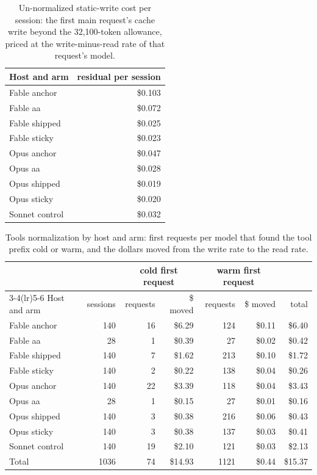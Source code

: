 \documentclass[11pt,letterpaper]{article}
\newcommand{\ToolsAllowance}{32{,}100}
\begin{document}
\begin{table}[tbp]
\centering\small
\caption{Un-normalized static-write cost per session: the first main request's cache write beyond the
\ToolsAllowance-token allowance, priced at the write-minus-read rate of that request's model.}
\label{vt:tab:staticresid}
\begin{tabular*}{0.6\textwidth}{@{\extracolsep{\fill}}l r@{}}
\toprule
Host and arm & residual per session \\
\midrule
Fable anchor & \$0.103 \\
Fable aa & \$0.072 \\
Fable shipped & \$0.025 \\
Fable sticky & \$0.023 \\
Opus anchor & \$0.047 \\
Opus aa & \$0.028 \\
Opus shipped & \$0.019 \\
Opus sticky & \$0.020 \\
Sonnet control & \$0.032 \\
\bottomrule
\end{tabular*}
 \end{table}

\begin{table}[tbp]
\centering\scriptsize
\caption{Tools normalization by host and arm: first requests per model that found the tool prefix cold or warm, and
the dollars moved from the write rate to the read rate.}
\label{vt:tab:toolsnorm}
\begin{tabular*}{\textwidth}{@{\extracolsep{\fill}}l r r r r r r@{}}
\toprule
 & & \multicolumn{2}{c}{cold first request} & \multicolumn{2}{c}{warm first request} & \\
\cmidrule(lr){3-4}\cmidrule(lr){5-6}
Host and arm & sessions & requests & \$ moved & requests & \$ moved & total \\
\midrule
Fable anchor & 140 & 16 & \$6.29 & 124 & \$0.11 & \$6.40 \\
Fable aa & 28 & 1 & \$0.39 & 27 & \$0.02 & \$0.42 \\
Fable shipped & 140 & 7 & \$1.62 & 213 & \$0.10 & \$1.72 \\
Fable sticky & 140 & 2 & \$0.22 & 138 & \$0.04 & \$0.26 \\
Opus anchor & 140 & 22 & \$3.39 & 118 & \$0.04 & \$3.43 \\
Opus aa & 28 & 1 & \$0.15 & 27 & \$0.01 & \$0.16 \\
Opus shipped & 140 & 3 & \$0.38 & 216 & \$0.06 & \$0.43 \\
Opus sticky & 140 & 3 & \$0.38 & 137 & \$0.03 & \$0.41 \\
Sonnet control & 140 & 19 & \$2.10 & 121 & \$0.03 & \$2.13 \\
\midrule
Total & 1036 & 74 & \$14.93 & 1121 & \$0.44 & \$15.37 \\
\bottomrule
\end{tabular*}
 \end{table}
\end{document}
